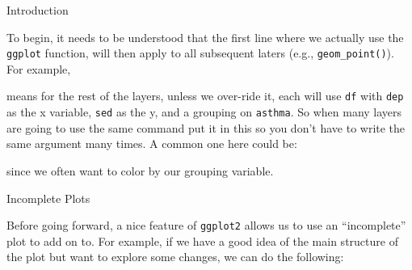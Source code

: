 \begin{frame}[fragile]{Introduction}

To begin, it needs to be understood that the first line where we
actually use the \texttt{ggplot} function, will then apply to all
subsequent laters (e.g., \texttt{geom\_point()}). For example,

\begin{Shaded}
\begin{Highlighting}[]
\NormalTok{(}
\end{Highlighting}
\end{Shaded}

means for the rest of the layers, unless we over-ride it, each will use
\texttt{df} with \texttt{dep} as the x variable, \texttt{sed} as the y,
and a grouping on \texttt{asthma}. So when many layers are going to use
the same command put it in this so you don't have to write the same
argument many times. A common one here could be:

\begin{Shaded}
\begin{Highlighting}[]
\NormalTok{(}
\end{Highlighting}
\end{Shaded}

since we often want to color by our grouping variable.

\end{frame}

\begin{frame}[fragile]{Incomplete Plots}

Before going forward, a nice feature of \texttt{ggplot2} allows us to
use an ``incomplete'' plot to add on to. For example, if we have a good
idea of the main structure of the plot but want to explore some changes,
we can do the following:

\begin{Shaded}
\begin{Highlighting}[]
\StringTok{ }\NormalTok{(}\OperatorTok{+}
\StringTok{  }\NormalTok{()}
\end{Highlighting}
\end{Shaded}

\end{frame}

